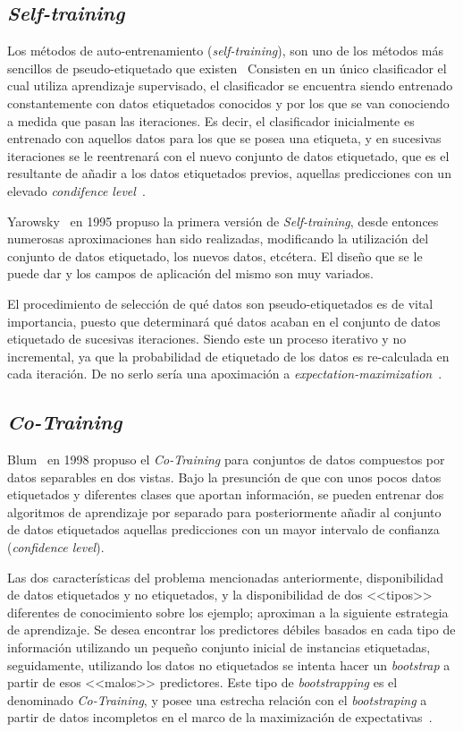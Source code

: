 \subsection{\textit{Self-training}}
Los métodos de auto-entrenamiento (\textit{self-training}), son uno de los métodos más sencillos de pseudo-etiquetado que existen~\cite{triguero2015self} Consisten en un único clasificador el cual utiliza aprendizaje supervisado, el clasificador se encuentra siendo entrenado constantemente con datos etiquetados conocidos y por los que se van conociendo a medida que pasan las iteraciones. Es decir, el clasificador inicialmente es entrenado con aquellos datos para los que se posea una etiqueta, y en sucesivas iteraciones se le reentrenará con el nuevo conjunto de datos etiquetado, que es el resultante de añadir a los datos etiquetados previos, aquellas predicciones con un elevado \textit{condifence level}~\cite{jesper2020survey}.

Yarowsky~\cite{yarowsky1995unsupervised} en 1995 propuso la primera versión de \textit{Self-training}, desde entonces numerosas aproximaciones han sido realizadas, modificando la utilización del conjunto de datos etiquetado, los nuevos datos, etcétera. El diseño que se le puede dar y los campos de aplicación del mismo son muy variados.

El procedimiento de selección de qué datos son pseudo-etiquetados es de vital importancia, puesto que determinará qué datos acaban en el conjunto de datos etiquetado de sucesivas iteraciones. Siendo este un proceso iterativo y no incremental, ya que la probabilidad de etiquetado de los datos es re-calculada en cada iteración. De no serlo sería una apoximación a \textit{expectation-maximization}~\cite{dempster1977maximum}.

\subsection{\textit{Co-Training}}
Blum~\cite{blum1998combining} en 1998 propuso el \textit{Co-Training} para conjuntos de datos compuestos por datos separables en dos vistas. Bajo la presunción de que con unos pocos datos etiquetados y diferentes clases que aportan información, se pueden entrenar dos algoritmos de aprendizaje por separado para posteriormente añadir al conjunto de datos etiquetados aquellas predicciones con un mayor intervalo de confianza (\textit{confidence level}).

Las dos características del problema mencionadas anteriormente, disponibilidad de datos etiquetados y no etiquetados, y la disponibilidad de dos <<tipos>> diferentes de conocimiento sobre los ejemplo; aproximan a la siguiente estrategia de aprendizaje. Se desea encontrar los predictores débiles basados en cada tipo de información utilizando un pequeño conjunto inicial de instancias etiquetadas, seguidamente, utilizando los datos no etiquetados se intenta hacer un \textit{bootstrap} a partir de esos <<malos>> predictores. Este tipo de \textit{bootstrapping} es el denominado \textit{Co-Training}, y posee una estrecha relación con el \textit{bootstraping} a partir de datos incompletos en el marco de la maximización de expectativas~\cite{ghahramani1994supervised, ratsaby1995learning}.

